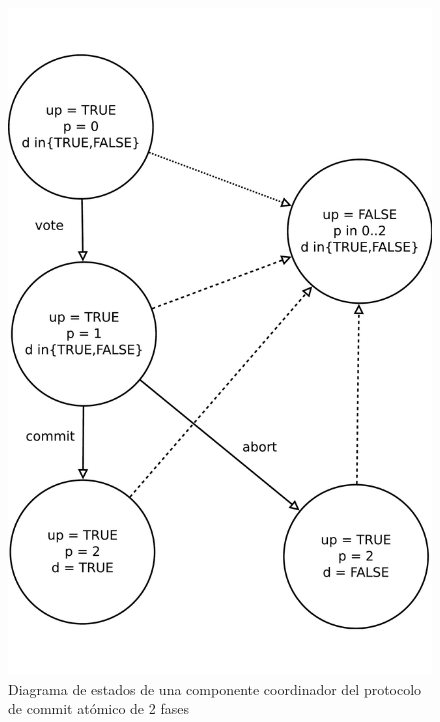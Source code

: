 \documentclass[titlepage, 12pt]{book}
\begin{document}
\begin{figure}[H]
  \centering
    \includegraphics[scale=0.75]{Imagenes/2pcCoor.pdf}
  \caption{Diagrama de estados de una componente coordinador del protocolo de commit atómico de 2 fases}
  \label{2pcc}
\end{figure}
~\\
\end{document}
